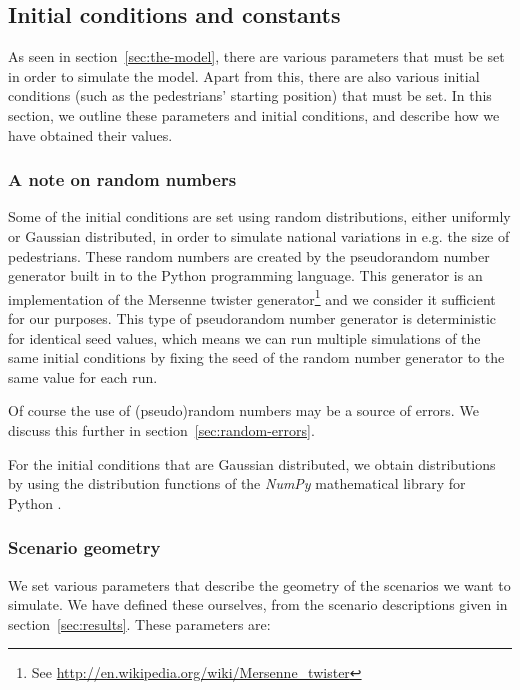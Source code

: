 \subsection{Initial conditions and constants}
\label{sec:init-cond}
As seen in section~\ref{sec:the-model}, there are various parameters that must 
be set in order to simulate the model. Apart from this, there are also various 
initial conditions (such as the pedestrians' starting position) that must be 
set. In this section, we outline these parameters and initial conditions, and 
describe how we have obtained their values.

\subsubsection{A note on random numbers}
Some of the initial conditions are set using random distributions, either 
uniformly or Gaussian distributed, in order to simulate national variations in 
e.g. the size of pedestrians.  These random numbers are created by the 
pseudorandom number generator built in to the Python programming language.  
This generator is an implementation of the Mersenne twister 
generator\footnote{See \url{http://en.wikipedia.org/wiki/Mersenne\_twister}} 
and we consider it sufficient for our purposes. This type of pseudorandom 
number generator is deterministic for identical seed values, which means we 
can run multiple simulations of the same initial conditions by fixing the seed 
of the random number generator to the same value for each run.

Of course the use of (pseudo)random numbers may be a source of errors. We 
discuss this further in section~\ref{sec:random-errors}.

For the initial conditions that are Gaussian distributed, we obtain 
distributions by using the distribution functions of the \emph{NumPy} 
mathematical library for Python \cite{numpy}.

\subsubsection{Scenario geometry}
We set various parameters that describe the geometry of the scenarios we want 
to simulate. We have defined these ourselves, from the scenario descriptions 
given in section~\ref{sec:results}. These parameters are:

